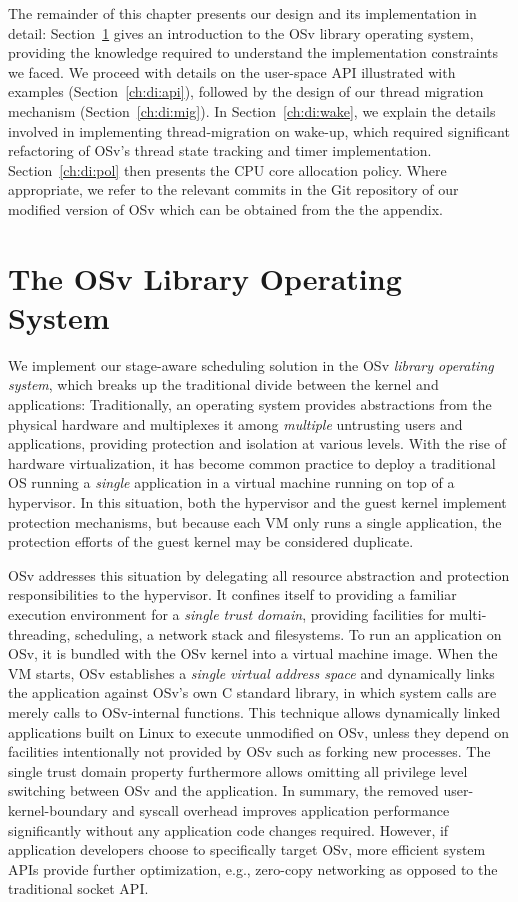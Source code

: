 \documentclass[12pt,a4paper]{book}
\begin{document}
The remainder of this chapter presents our design and its implementation in detail:
Section~\ref{ch:di:osv} gives an introduction to the OSv library operating system, providing the knowledge required to understand the implementation constraints we faced.
We proceed with details on the user-space API illustrated with examples (Section~\ref{ch:di:api}), followed by the design of our thread migration mechanism (Section~\ref{ch:di:mig}).
In Section~\ref{ch:di:wake}, we explain the details involved in implementing thread-migration on wake-up, which required significant refactoring of OSv's thread state tracking and timer implementation.
Section~\ref{ch:di:pol} then presents the CPU core allocation policy.
Where appropriate, we refer to the relevant commits in the Git repository of our modified version of OSv which can be obtained from the the appendix.

\section{The OSv Library Operating System}\label{ch:di:osv}
We implement our stage-aware scheduling solution in the OSv \emph{library operating system}, which breaks up the traditional divide between the kernel and applications:
Traditionally, an operating system provides abstractions from the physical hardware and multiplexes it among \emph{multiple} untrusting users and applications, providing protection and isolation at various levels.
With the rise of hardware virtualization, it has become common practice to deploy a traditional OS running a \emph{single} application in a virtual machine running on top of a hypervisor.
In this situation, both the hypervisor and the guest kernel implement protection mechanisms, but because each VM only runs a single application, the protection efforts of the guest kernel may be considered duplicate.~\cite{mirageOS,osvMain}

OSv addresses this situation by delegating all resource abstraction and protection responsibilities to the hypervisor.
It confines itself to providing a familiar execution environment for a \emph{single trust domain}, providing facilities for multi-threading, scheduling, a network stack and filesystems.
To run an application on OSv, it is bundled with the OSv kernel into a virtual machine image.
When the VM starts, OSv establishes a \emph{single virtual address space} and dynamically links the application against OSv's own C standard library, in which system calls are merely calls to OSv-internal functions.
This technique allows dynamically linked applications built on Linux to execute unmodified on OSv, unless they depend on facilities intentionally not provided by OSv such as forking new processes.
The single trust domain property furthermore allows omitting all privilege level switching between OSv and the application.
In summary, the removed user-kernel-boundary and syscall overhead improves application performance significantly without any application code changes required.
However, if application developers choose to specifically target OSv, more efficient system APIs provide further optimization, e.g., zero-copy networking as opposed to the traditional socket API.~\cite{osvMain}
\end{document}
